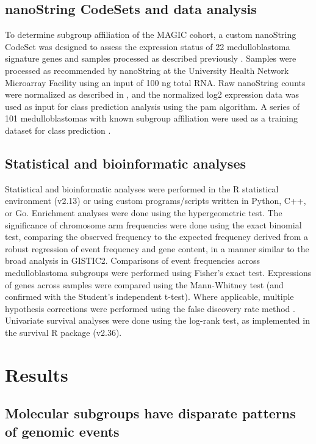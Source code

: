 \subsection{nanoString CodeSets and data analysis}

To determine subgroup affiliation of the MAGIC cohort, a custom nanoString CodeSet was designed to assess the expression status of 22 medulloblastoma signature genes and samples processed as described previously . Samples were processed as recommended by nanoString at the University Health Network Microarray Facility using an input of 100 ng total RNA. Raw nanoString counts were normalized as described in , and the normalized log2 expression data was used as input for class prediction analysis using the \gls{pam} algorithm. A series of 101 medulloblastomas with known subgroup affiliation were used as a training dataset for class prediction .

\subsection{Statistical and bioinformatic analyses}

Statistical and bioinformatic analyses were performed in the R statistical environment (v2.13) or using custom programs/scripts written in Python, C++, or Go. Enrichment analyses were done using the hypergeometric test. The significance of chromosome arm frequencies were done using the exact binomial test, comparing the observed frequency to the expected frequency derived from a robust regression of event frequency and gene content, in a manner similar to the broad analysis in GISTIC2. Comparisons of event frequencies across medulloblastoma subgroups were performed using Fisher's exact test. Expressions of genes across samples were compared using the Mann-Whitney test (and confirmed with the Student's independent t-test). Where applicable, multiple hypothesis corrections were performed using the false discovery rate method . Univariate survival analyses were done using the log-rank test, as implemented in the survival R package (v2.36).

\clearpage

\section{Results}

\subsection{Molecular subgroups have disparate patterns of genomic events}

